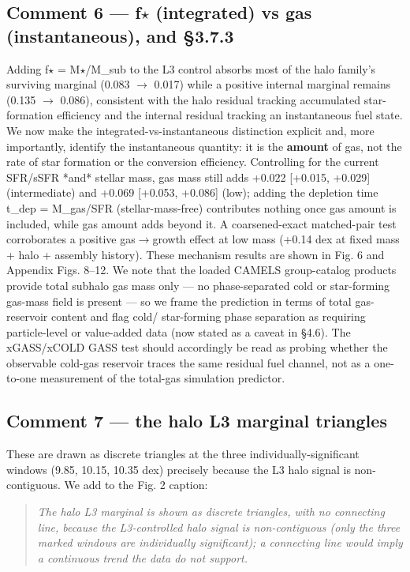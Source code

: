 \documentclass[11pt]{article}
\begin{document}
\subsection*{Comment 6 --- f$\star$ (integrated) vs gas (instantaneous), and \S{}3.7.3}
Adding f$\star$ = M$\star$/M\_sub to the L3 control absorbs most of the halo family's surviving marginal (0.083 $\rightarrow$ 0.017) while a positive internal marginal remains (0.135 $\rightarrow$ 0.086), consistent with the halo residual tracking accumulated star-formation efficiency and the internal residual tracking an instantaneous fuel state. We now make the integrated-vs-instantaneous distinction explicit and, more importantly, identify the instantaneous quantity: it is the \textbf{amount} of gas, not the rate of star formation or the conversion efficiency. Controlling for the current SFR/sSFR *and* stellar mass, gas mass still adds +0.022 [+0.015, +0.029] (intermediate) and +0.069 [+0.053, +0.086] (low); adding the depletion time t\_dep = M\_gas/SFR (stellar-mass-free) contributes nothing once gas amount is included, while gas amount adds beyond it. A coarsened-exact matched-pair test corroborates a positive gas$\rightarrow$growth effect at low mass (+0.14 dex at fixed mass + halo + assembly history). These mechanism results are shown in Fig. 6 and Appendix Figs. 8--12. We note that the loaded CAMELS group-catalog products provide total subhalo gas mass only --- no phase-separated cold or star-forming gas-mass field is present --- so we frame the prediction in terms of total gas-reservoir content and flag cold/ star-forming phase separation as requiring particle-level or value-added data (now stated as a caveat in \S{}4.6). The xGASS/xCOLD GASS test should accordingly be read as probing whether the observable cold-gas reservoir traces the same residual fuel channel, not as a one-to-one measurement of the total-gas simulation predictor.

\subsection*{Comment 7 --- the halo L3 marginal triangles}
These are drawn as discrete triangles at the three individually-significant windows (9.85, 10.15, 10.35 dex) precisely because the L3 halo signal is non-contiguous. We add to the Fig. 2 caption:

\begin{quote}\itshape
The halo L3 marginal is shown as discrete triangles, with no connecting line, because the L3-controlled halo signal is non-contiguous (only the three marked windows are individually significant); a connecting line would imply a continuous trend the data do not support.
\end{quote}
\end{document}
